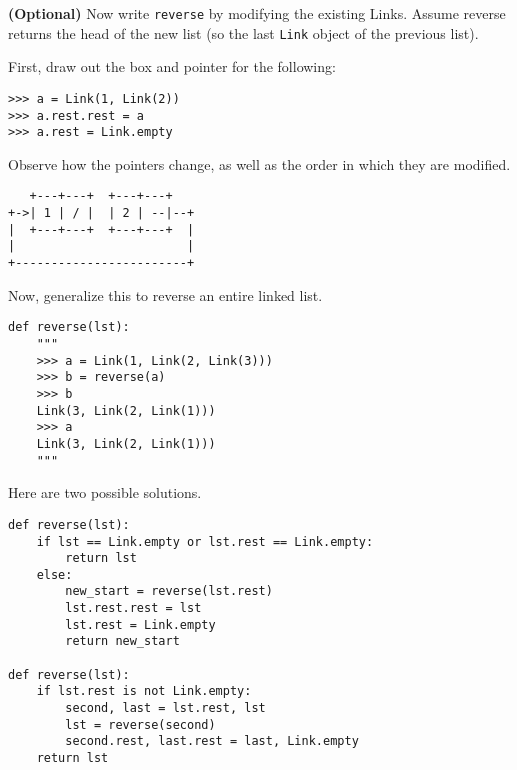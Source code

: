 \begin{blocksection}
\question \textbf{(Optional)} Now write \texttt{reverse} by modifying the existing Links. Assume reverse returns the head of the new list (so the last \texttt{Link} object of the previous list).

First, draw out the box and pointer for the following:
\begin{lstlisting}
>>> a = Link(1, Link(2))
>>> a.rest.rest = a
>>> a.rest = Link.empty
\end{lstlisting}
Observe how the pointers change, as well as the order in which they are
modified.
\begin{solution}[0.6in]
\begin{lstlisting}
   +---+---+  +---+---+
+->| 1 | / |  | 2 | --|--+
|  +---+---+  +---+---+  |
|                        |
+------------------------+
\end{lstlisting}
\end{solution}
\end{blocksection}

\begin{blocksection}
Now, generalize this to reverse an entire linked list.
\begin{lstlisting}
def reverse(lst):
    """
    >>> a = Link(1, Link(2, Link(3)))
    >>> b = reverse(a)
    >>> b
    Link(3, Link(2, Link(1)))
    >>> a
    Link(3, Link(2, Link(1)))
    """
\end{lstlisting}
\begin{solution}[1.25in]
Here are two possible solutions.
\begin{lstlisting}
def reverse(lst):
    if lst == Link.empty or lst.rest == Link.empty:
        return lst
    else:
        new_start = reverse(lst.rest)
        lst.rest.rest = lst
        lst.rest = Link.empty
        return new_start

def reverse(lst):
    if lst.rest is not Link.empty:
        second, last = lst.rest, lst
        lst = reverse(second)
        second.rest, last.rest = last, Link.empty
    return lst
\end{lstlisting}
\end{solution}


\end{blocksection}